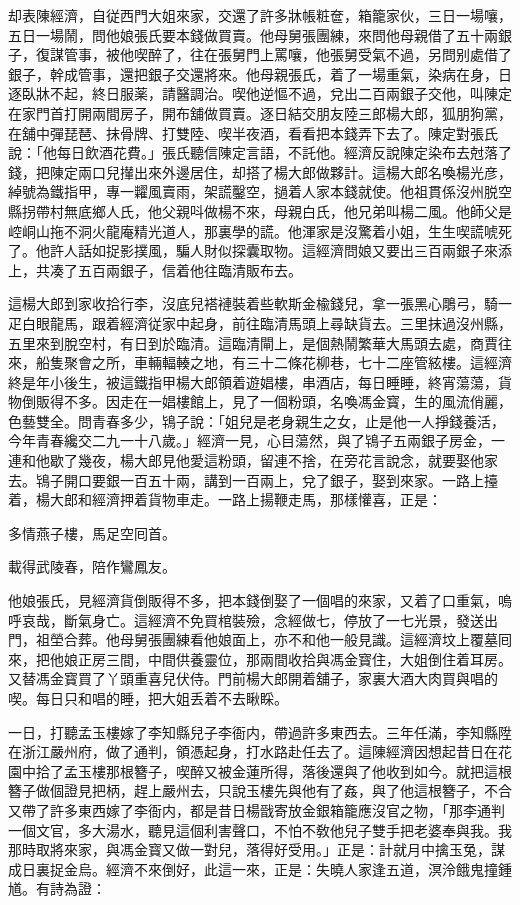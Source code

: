 却表陳經濟，自従西門大姐來家，交還了許多牀帳粧奩，箱籠家伙，三日一場嚷，五日一場鬧，問他娘張氏要本錢做買賣。他母舅張團練，來問他母親借了五十兩銀子，復謀管事，被他喫醉了，往在張舅門上罵嚷，他張舅受氣不過，另問别處借了銀子，幹成管事，還把銀子交還將來。他母親張氏，着了一場重氣，染病在身，日逐臥牀不起，終日服薬，請醫調治。喫他逆慪不過，兌出二百兩銀子交他，叫陳定在家門首打開兩間房子，開布舖做買賣。逐日結交朋友陸三郎楊大郎，狐朋狗黨，在舖中彈琵琶、抹骨牌、打雙陸、喫半夜酒，看看把本錢弄下去了。陳定對張氏說：「他每日飲酒花費。」張氏聽信陳定言語，不託他。經濟反說陳定染布去尅落了錢，把陳定兩口兒攆出來外邊居住，却搭了楊大郎做夥計。這楊大郎名喚楊光彦，綽號為鐵指甲，專一糶風賣雨，架謊鑿空，撾着人家本錢就使。他祖貫係沒州脱空縣拐帶村無底鄉人氏，他父親呌做楊不來，母親白氏，他兄弟叫楊二風。他師父是崆峒山拖不洞火龍庵精光道人，那裏學的謊。他渾家是沒驚着小姐，生生喫謊唬死了。他許人話如捉影撲風，騙人財似探囊取物。這經濟問娘又要出三百兩銀子來添上，共凑了五百兩銀子，信着他往臨清販布去。

這楊大郎到家收拾行李，沒底兒褡褳裝着些軟斯金楡錢兒，拿一張黑心鵰弓，騎一疋白眼龍馬，跟着經濟従家中起身，前往臨清馬頭上尋缺貨去。三里抹過沒州縣，五里來到脫空村，有日到於臨清。這臨清閘上，是個熱鬧繁華大馬頭去處，商賈往來，船隻聚會之所，車輛輻輳之地，有三十二條花柳巷，七十二座管絃樓。這經濟終是年小後生，被這鐵指甲楊大郎領着遊娼樓，串酒店，每日睡睡，終宵蕩蕩，貨物倒販得不多。因走在一娼樓館上，見了一個粉頭，名喚馮金寳，生的風流俏麗，色藝雙全。問青春多少，鴇子說：「姐兒是老身親生之女，止是他一人掙錢養活，今年青春纔交二九一十八歲。」經濟一見，心目蕩然，與了鴇子五兩銀子房金，一連和他歇了幾夜，楊大郎見他愛這粉頭，留連不捨，在旁花言說念，就要娶他家去。鴇子開口要銀一百五十兩，講到一百兩上，兌了銀子，娶到來家。一路上擡着，楊大郎和經濟押着貨物車走。一路上揚鞭走馬，那樣懽喜，正是：

多情燕子樓，馬足空囘首。

載得武陵春，陪作鸞鳳友。

他娘張氏，見經濟貨倒販得不多，把本錢倒娶了一個唱的來家，又着了口重氣，嗚呼哀哉，斷氣身亡。這經濟不免買棺裝殮，念經做七，停放了一七光景，發送出門，祖塋合葬。他母舅張團練看他娘面上，亦不和他一般見識。這經濟坟上覆墓囘來，把他娘正房三間，中間供養靈位，那兩間收拾與馮金寳住，大姐倒住着耳房。又替馮金寳買了丫頭重喜兒伏侍。門前楊大郎開着舖子，家裏大酒大肉買與唱的喫。每日只和唱的睡，把大姐丢着不去瞅睬。

一日，打聽孟玉樓嫁了李知縣兒子李衙内，帶過許多東西去。三年任滿，李知縣陞在浙江嚴州府，做了通判，領憑起身，打水路赴任去了。這陳經濟因想起昔日在花園中拾了孟玉樓那根簪子，喫醉又被金蓮所得，落後還與了他收到如今。就把這根簪子做個證見把柄，趕上嚴州去，只說玉樓先與他有了姦，與了他這根簪子，不合又帶了許多東西嫁了李衙内，都是昔日楊戩寄放金銀箱籠應沒官之物，「那李通判一個文官，多大湯水，聽見這個利害聲口，不怕不敎他兒子雙手把老婆奉與我。我那時取將來家，與馮金寳又做一對兒，落得好受用。」正是：計就月中擒玉兔，謀成日裏捉金烏。經濟不來倒好，此這一來，正是：失曉人家逢五道，溟泠餓鬼撞鍾馗。有詩為證：

